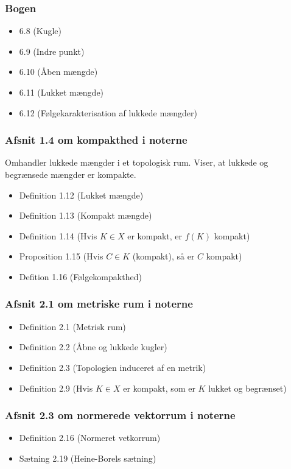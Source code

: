 \subsubsection{Bogen}
\begin{itemize}
\setlength\itemsep{0em}
\item 6.8 (Kugle)
\item 6.9 (Indre punkt)
\item 6.10 (Åben mængde)
\item 6.11 (Lukket mængde)
\item 6.12 (Følgekarakterisation af lukkede mængder)
\end{itemize}
\subsubsection{Afsnit 1.4 om kompakthed i noterne}
Omhandler lukkede mængder i et topologisk rum. Viser, at lukkede og begrænsede mængder er kompakte.
\begin{itemize}
\setlength\itemsep{0em}
\item Definition 1.12 (Lukket mængde)
\item Definition 1.13 (Kompakt mængde)
\item Definition 1.14 (Hvis $K \in X$ er kompakt, er $f(K)$ kompakt)
\item Proposition 1.15 (Hvis $C \in K$ (kompakt), så er $C$ kompakt)
\item Defition 1.16 (Følgekompakthed)
\end{itemize}
\subsubsection{Afsnit 2.1 om metriske rum i noterne}
\begin{itemize}
\setlength\itemsep{0em}
\item Definition 2.1 (Metrisk rum)
\item Definition 2.2 (Åbne og lukkede kugler)
\item Definition 2.3 (Topologien induceret af en metrik)
\item Definition 2.9 (Hvis $K \in X$ er kompakt, som er $K$ lukket og begrænset)
\end{itemize}
\subsubsection{Afsnit 2.3 om normerede vektorrum i noterne}
\begin{itemize}
\setlength\itemsep{0em}
\item Definition 2.16 (Normeret vetkorrum)
\item Sætning 2.19 (Heine-Borels sætning)
\end{itemize}
